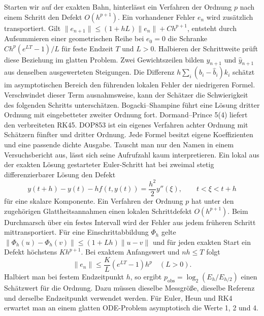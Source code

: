 \hypertarget{punkt2-2-1}{}
Starten wir auf der exakten Bahn, hinterlässt ein Verfahren der Ordnung \(p\) nach einem Schritt den Defekt \(O(h^{p+1})\). Ein vorhandener Fehler \(e_n\) wird zusätzlich transportiert. Gilt \(\|e_{n+1}\|\le(1+hL)\|e_n\|+Ch^{p+1}\), entsteht durch Aufsummieren einer geometrischen Reihe bei \(e_0=0\) die Schranke \(Ch^p(e^{LT}-1)/L\) für feste Endzeit \(T\) und \(L>0\). Halbieren der Schrittweite prüft diese Beziehung im glatten Problem.
\hypertarget{punkt2-2-2}{}
Zwei Gewichtszeilen bilden \(y_{n+1}\) und \(\hat y_{n+1}\) aus denselben ausgewerteten Steigungen. Die Differenz \(h\sum_i(b_i-\hat b_i)k_i\) schätzt im asymptotischen Bereich den führenden lokalen Fehler der niedrigeren Formel. Verschwindet dieser Term ausnahmsweise, kann der Schätzer die Schwierigkeit des folgenden Schritts unterschätzen.
\hypertarget{punkt2-2-3}{}
Bogacki–Shampine führt eine Lösung dritter Ordnung mit eingebetteter zweiter Ordnung fort. Dormand–Prince 5(4) liefert den verbreiteten RK45. DOP853 ist ein eigenes Verfahren achter Ordnung mit Schätzern fünfter und dritter Ordnung. Jede Formel besitzt eigene Koeffizienten und eine passende dichte Ausgabe. Tauscht man nur den Namen in einem Versuchsbericht aus, lässt sich seine Aufrufzahl kaum interpretieren.
Ein lokal aus der exakten Lösung gestarteter Euler-Schritt hat bei zweimal stetig differenzierbarer Lösung den Defekt
\[
 y(t+h)-y(t)-hf(t,y(t))=\frac{h^2}{2}y''(\xi),\qquad t<\xi<t+h
\]
für eine skalare Komponente. Ein Verfahren der Ordnung \(p\) hat unter den zugehörigen Glattheitsannahmen einen lokalen Schrittdefekt \(O(h^{p+1})\). Beim Durchmarsch über ein festes Intervall wird der Fehler aus jedem früheren Schritt mittransportiert.
Für eine Einschrittabbildung \(\Phi_h\) gelte \(\|\Phi_h(u)-\Phi_h(v)\|\le(1+Lh)\|u-v\|\) und für jeden exakten Start ein Defekt höchstens \(Kh^{p+1}\). Bei exaktem Anfangswert und \(nh\le T\) folgt
\[
 \|e_n\|\le \frac{K}{L}(e^{LT}-1)h^p\quad (L>0).
\]
Halbiert man bei festem Endzeitpunkt \(h\), so ergibt \(p_\mathrm{obs}=\log_2(E_h/E_{h/2})\) einen Schätzwert für die Ordnung. Dazu müssen dieselbe Messgröße, dieselbe Referenz und derselbe Endzeitpunkt verwendet werden. Für Euler, Heun und RK4 erwartet man an einem glatten ODE-Problem asymptotisch die Werte 1, 2 und 4.

